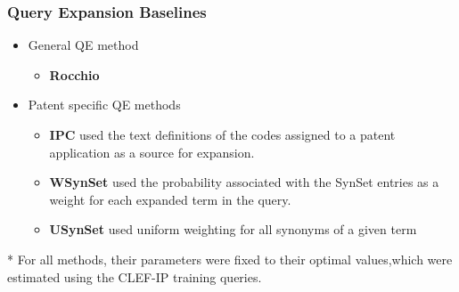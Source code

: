 \documentclass[xcolor=x11names,compress]{beamer}
\renewcommand{\(}{\begin{columns}}
\renewcommand{\)}{\end{columns}}
\newcommand{\<}[1]{\begin{column}{#1}}
\renewcommand{\>}{\end{column}}
\begin{document}
\begin{frame}
\frametitle{Query Expansion Baselines}

\begin{itemize}
\item {\color{DeepSkyBlue4}General QE method}
	\begin{itemize}
	\item \textbf{Rocchio}~\citep{Salton1971}
	\end{itemize}
\item {\color{DeepSkyBlue4}Patent specific QE methods}
	\begin{itemize}
	\item \textbf{IPC} \citep{Mahdabi2013} used the text definitions of the  codes assigned to a patent application as a source for expansion.
	\item \textbf{WSynSet} \citep{Magdy2011} used the probability associated with the SynSet entries as a weight for each expanded term in the query.
	\item \textbf{USynSet} \citep{Magdy2011} used uniform weighting for all synonyms of a given term 
	\end{itemize}
\end{itemize}
	


\begin{small}
* For all methods, their parameters were fixed to their optimal values,which were estimated using the CLEF-IP training queries.
\end{small}

\end{frame}
\end{document}
